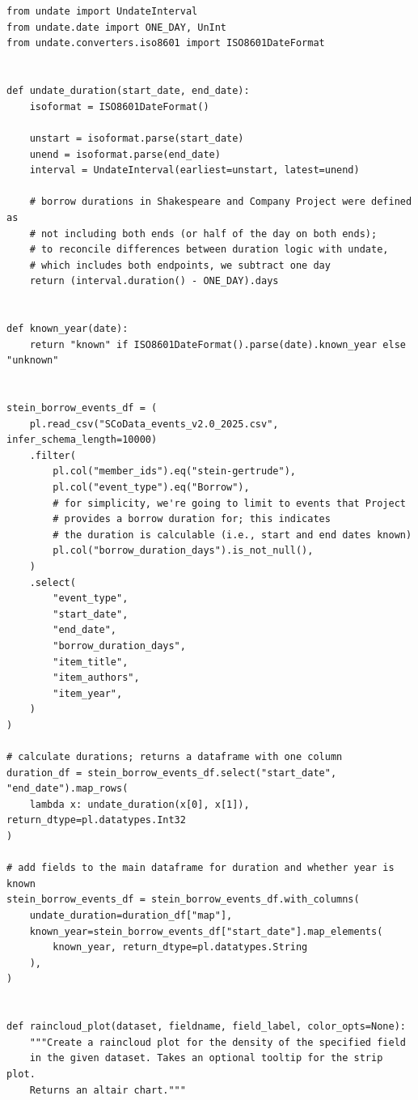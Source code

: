 \documentclass{anthology-ch}         %
\begin{document}
\begin{verbatim}


from undate import UndateInterval
from undate.date import ONE_DAY, UnInt
from undate.converters.iso8601 import ISO8601DateFormat


def undate_duration(start_date, end_date):
    isoformat = ISO8601DateFormat()

    unstart = isoformat.parse(start_date)
    unend = isoformat.parse(end_date)
    interval = UndateInterval(earliest=unstart, latest=unend)

    # borrow durations in Shakespeare and Company Project were defined as
    # not including both ends (or half of the day on both ends);
    # to reconcile differences between duration logic with undate, 
    # which includes both endpoints, we subtract one day
    return (interval.duration() - ONE_DAY).days


def known_year(date):
    return "known" if ISO8601DateFormat().parse(date).known_year else "unknown"


stein_borrow_events_df = (
    pl.read_csv("SCoData_events_v2.0_2025.csv", infer_schema_length=10000)
    .filter(
        pl.col("member_ids").eq("stein-gertrude"),
        pl.col("event_type").eq("Borrow"),
        # for simplicity, we're going to limit to events that Project
        # provides a borrow duration for; this indicates
        # the duration is calculable (i.e., start and end dates known)
        pl.col("borrow_duration_days").is_not_null(),
    )
    .select(
        "event_type",
        "start_date",
        "end_date",
        "borrow_duration_days",
        "item_title",
        "item_authors",
        "item_year",
    )
)

# calculate durations; returns a dataframe with one column
duration_df = stein_borrow_events_df.select("start_date", "end_date").map_rows(
    lambda x: undate_duration(x[0], x[1]), return_dtype=pl.datatypes.Int32
)

# add fields to the main dataframe for duration and whether year is known
stein_borrow_events_df = stein_borrow_events_df.with_columns(
    undate_duration=duration_df["map"],
    known_year=stein_borrow_events_df["start_date"].map_elements(
        known_year, return_dtype=pl.datatypes.String
    ),
)


def raincloud_plot(dataset, fieldname, field_label, color_opts=None):
    """Create a raincloud plot for the density of the specified field
    in the given dataset. Takes an optional tooltip for the strip plot.
    Returns an altair chart."""


\end{verbatim}
\end{document}

